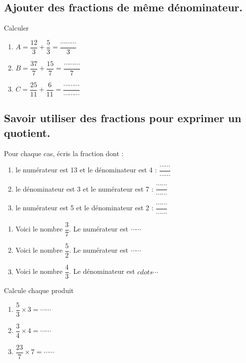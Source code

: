 \subsection{Ajouter des fractions de même dénominateur.}



Calculer

\begin{enumerate}
\item $A = \dfrac{12}{3} +\dfrac{5}{3} = \dfrac{\cdots\cdots\cdots }{3}  $
\item $B = \dfrac{37}{7} +\dfrac{15}{7} = \dfrac{\cdots\cdots\cdots }{7}  $
\item $C = \dfrac{25}{11} +\dfrac{6}{11} = \dfrac{\cdots\cdots\cdots }{\cdots\cdots\cdots } $
\end{enumerate}





\subsection{Savoir utiliser des fractions pour exprimer un quotient.}




Pour chaque cas, écris la fraction dont :
\begin{enumerate}
\item le numérateur est 13 et le dénominateur est 4 : $\dfrac{\cdots\cdots}{\cdots\cdots} $
\item le dénominateur est 3 et le numérateur est 7  : $\dfrac{\cdots\cdots}{\cdots\cdots} $
\item le numérateur est 5 et le dénominateur est 2 : $\dfrac{\cdots\cdots}{\cdots\cdots} $
\end{enumerate}



\begin{enumerate}
\item Voici le nombre $\dfrac{3}{7}$. Le numérateur est $\cdots\cdots$
\item Voici le nombre $\dfrac{5}{2}$. Le numérateur est $\cdots\cdots$
\item Voici le nombre $\dfrac{4}{3}$. Le dénominateur est $cdots\cdots$
\end{enumerate}



Calcule chaque produit
\begin{enumerate}
\item $\dfrac{5}{3} \times 3 = \cdots\cdots $
\item $\dfrac{3}{4} \times 4 = \cdots\cdots $
\item $\dfrac{23}{7} \times 7 = \cdots\cdots $
\end{enumerate}



